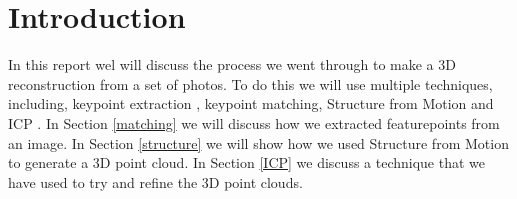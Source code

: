 \section{Introduction}
\label{intro}
In this report wel will discuss the process we went through to make a 3D reconstruction from a set of photos. To do this we will use multiple techniques, including, keypoint extraction \cite{SIFT}, keypoint matching, Structure from Motion \cite{SfM} and ICP \cite{ICP}.
In Section \ref{matching} we will discuss how we extracted featurepoints from an image. In Section \ref{structure} we will show how we used Structure from Motion to generate a 3D point cloud. In Section \ref{ICP} we discuss a technique that we have used to try and refine the 3D point clouds.
